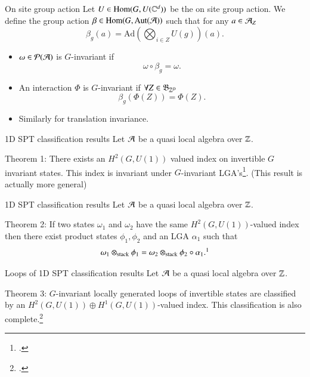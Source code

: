 \documentclass{beamer}
\begin{document}
\begin{frame}{On site group action}
Let $U\in\textrm{Hom}(G,U(\CC^d))$ be the on site group action. We define the group action $\beta\in\textrm{Hom}(G,\textrm{Aut}(\AA))$ such that for any $a\in\AA_Z$
\[\beta_g(a)=\textrm{Ad}\left(\bigotimes_{i\in Z}U(g)\right)(a).\]
\pause
\begin{itemize}
\item $\omega\in\mathcal{P}(\AA)$ is $G$-invariant if
\[\omega\circ\beta_g=\omega.\]
\pause
\item An interaction $\Phi$ is $G$-invariant if $\forall Z\in\mathfrak{B}_{\ZZ^D}$
\[\beta_g(\Phi(Z))=\Phi(Z).\]
\pause
\item Similarly for translation invariance.
\end{itemize}
\end{frame}

\begin{frame}{1D SPT classification results}
Let $\AA$ be a quasi local algebra over $\ZZ$.
\begin{block}{Theorem 1:}
There exists an $H^2(G,U(1))$ valued index on invertible $G$ invariant states. This index is invariant under $G$-invariant LGA's\footcite{ogata2019classification}. (This result is actually more general)
\end{block}
\end{frame}

\begin{frame}{1D SPT classification results}
Let $\AA$ be a quasi local algebra over $\ZZ$.
\begin{block}{Theorem 2:}
If two states $\omega_1$ and $\omega_2$ have the same $H^2(G,U(1))$-valued index then there exist product states $\phi_1,\phi_2$ and an LGA $\alpha_1$ such that
\[\omega_1\otimes_{\text{stack}}\phi_1=\omega_2\otimes_{\text{stack}}\phi_2\circ\alpha_1.\footcite{kapustin2021classification}\]
\end{block}
\end{frame}

\begin{frame}{Loops of 1D SPT classification results}
Let $\AA$ be a quasi local algebra over $\ZZ$.
\begin{block}{Theorem 3:}
$G$-invariant locally generated loops of invertible states are classified by an $H^2(G,U(1))\oplus H^1(G,U(1))$-valued index. This classification is also complete.\footcite{https://doi.org/10.48550/arxiv.2204.03763}
\end{block}
\end{frame}
\end{document}

